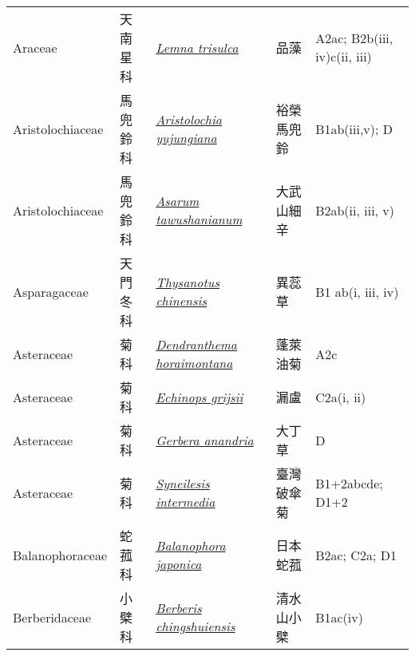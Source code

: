 {\begin{longtable}{p{2.5cm}p{2cm}p{5cm}p{2.5cm}p{3cm}}
    Araceae & 天南星科 & \href{http://www.theplantlist.org/tpl1.1/search?q=Lemna+trisulca}{\textit{Lemna trisulca} } & 品藻 & A2ac; B2b(iii, iv)c(ii, iii) \index{Lemna@\textit{Lemna}!trisulca@\textit{trisulca}}  \index{品藻} \\
    Aristolochiaceae & 馬兜鈴科 & \href{http://www.theplantlist.org/tpl1.1/search?q=Aristolochia+yujungiana}{\textit{Aristolochia yujungiana} } & 裕榮馬兜鈴 & B1ab(iii,v); D \index{Aristolochia@\textit{Aristolochia}!yujungiana@\textit{yujungiana}}  \index{裕榮馬兜鈴} \\
    Aristolochiaceae & 馬兜鈴科 & \href{http://www.theplantlist.org/tpl1.1/search?q=Asarum+tawushanianum}{\textit{Asarum tawushanianum} } & 大武山細辛 & B2ab(ii, iii, v) \index{Asarum@\textit{Asarum}!tawushanianum@\textit{tawushanianum}}  \index{大武山細辛} \\
    Asparagaceae & 天門冬科 & \href{http://www.theplantlist.org/tpl1.1/search?q=Thysanotus+chinensis}{\textit{Thysanotus chinensis} } & 異蕊草 & B1 ab(i, iii, iv) \index{Thysanotus@\textit{Thysanotus}!chinensis@\textit{chinensis}}  \index{異蕊草} \\
    Asteraceae & 菊科 & \href{http://www.theplantlist.org/tpl1.1/search?q=Dendranthema+horaimontana}{\textit{Dendranthema horaimontana} } & 蓬萊油菊 & A2c \index{Dendranthema@\textit{Dendranthema}!horaimontana@\textit{horaimontana}}  \index{蓬萊油菊} \\
    Asteraceae & 菊科 & \href{http://www.theplantlist.org/tpl1.1/search?q=Echinops+grijsii}{\textit{Echinops grijsii} } & 漏盧 & C2a(i, ii) \index{Echinops@\textit{Echinops}!grijsii@\textit{grijsii}}  \index{漏盧} \\
    Asteraceae & 菊科 & \href{http://www.theplantlist.org/tpl1.1/search?q=Gerbera+anandria}{\textit{Gerbera anandria} } & 大丁草 & D \index{Gerbera@\textit{Gerbera}!anandria@\textit{anandria}}  \index{大丁草} \\
    Asteraceae & 菊科 & \href{http://www.theplantlist.org/tpl1.1/search?q=Syneilesis+intermedia}{\textit{Syneilesis intermedia} } & 臺灣破傘菊 & B1+2abcde; D1+2 \index{Syneilesis@\textit{Syneilesis}!intermedia@\textit{intermedia}}  \index{臺灣破傘菊} \\
    Balanophoraceae & 蛇菰科 & \href{http://www.theplantlist.org/tpl1.1/search?q=Balanophora+japonica}{\textit{Balanophora japonica} } & 日本蛇菰 & B2ac; C2a; D1 \index{Balanophora@\textit{Balanophora}!japonica@\textit{japonica}}  \index{日本蛇菰} \\
    Berberidaceae & 小檗科 & \href{http://www.theplantlist.org/tpl1.1/search?q=Berberis+chingshuiensis}{\textit{Berberis chingshuiensis} } & 清水山小檗 & B1ac(iv) \index{Berberis@\textit{Berberis}!chingshuiensis@\textit{chingshuiensis}}  \index{清水山小檗} \\

\end{longtable}}
